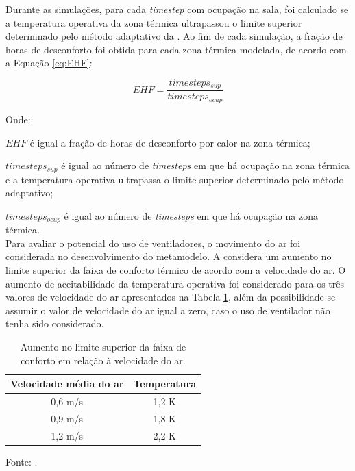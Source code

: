\documentclass[brazil,hardcopy,openany,a5paper]{ufscthesis}
\begin{document}
		Durante as simulações, para cada \textit{timestep} com ocupação na sala, foi calculado se a temperatura operativa da zona térmica ultrapassou o limite superior determinado pelo método adaptativo da  \cite{ASHRAEStandard552017}. Ao fim de cada simulação, a fração de horas de desconforto foi obtida para cada zona térmica modelada, de acordo com a Equação \ref{eq:EHF}:
		
		\begin{equation}
		\label{eq:EHF}
		EHF = \frac{timesteps_{sup}}{timesteps_{ocup}}
		\end{equation}
		
		Onde:
		
		$EHF$ é igual a fração de horas de desconforto por calor na zona térmica;
		
		$timesteps_{sup}$ é igual ao número de \textit{timesteps} em que há ocupação na zona térmica e a temperatura operativa ultrapassa o limite superior determinado pelo método adaptativo;
		
		$timesteps_{ocup}$ é igual ao número de \textit{timesteps} em que há ocupação na zona térmica.
		\\
		
		Para avaliar o potencial do uso de ventiladores, o movimento do ar foi considerada no desenvolvimento do metamodelo.
		A  \cite{ASHRAEStandard552017} considera um aumento no limite superior da faixa de conforto térmico de acordo com a velocidade do ar.
		O aumento de aceitabilidade da temperatura operativa foi considerado para os três valores de velocidade do ar apresentados na Tabela \ref{table:var}, além da possibilidade se assumir o valor de velocidade do ar igual a zero, caso o uso de ventilador não tenha sido considerado.
		
		\begin{table}[h]
			\centering
			\caption{Aumento no limite superior da faixa de conforto em relação à velocidade do ar.}
			\label{table:var}
			\begin{tabular}{|c |c |}
				\hline
				\textbf{Velocidade média do ar} & \textbf{Temperatura} \\
				\hline
				0,6 m/s & 1,2 K \\
				\hline
				0,9 m/s & 1,8 K \\
				\hline
				1,2 m/s & 2,2 K \\
				\hline 
			\end{tabular}
			\begin{flushleft}
				Fonte:   \cite{ASHRAEStandard552017}.
			\end{flushleft}				
		\end{table}
	
\end{document}
